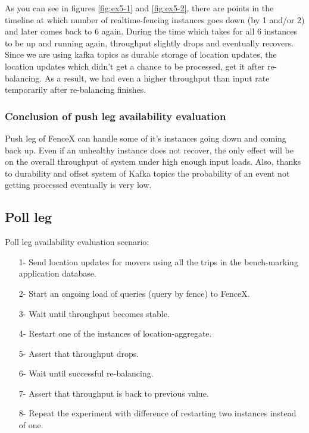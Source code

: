 \documentclass[a4]{report}
\begin{document}
    As you can see in figures \ref{fig:ex5-1} and \ref{fig:ex5-2}, there are points in the timeline at which number of
    realtime-fencing instances goes down (by 1 and/or 2) and later comes back to 6 again.
    During the time which takes for all 6 instances to be up and running again, throughput slightly drops and
    eventually recovers.
    Since we are using kafka topics as durable storage of location updates, the location updates which
    didn't get a chance to be processed, get it after re-balancing.
    As a result, we had even a higher throughput than input rate temporarily after re-balancing finishes.

    \subsubsection{Conclusion of push leg availability evaluation}
    Push leg of FenceX can handle some of it's instances going down and coming back up.
    Even if an unhealthy instance does not recover, the only effect will be on the overall throughput of system under
    high enough input loads.
    Also, thanks to durability and offset system of Kafka topics the probability of an event not getting processed
    eventually is very low.

    \subsection{Poll leg}
    Poll leg availability evaluation scenario:
    \begin{itemize}
        \item[1-] Send location updates for movers using all the trips in the bench-marking application database.
        \item[2-] Start an ongoing load of queries (query by fence) to FenceX.
        \item[3-] Wait until throughput becomes stable.
        \item[4-] Restart one of the instances of location-aggregate.
        \item[5-] Assert that throughput drops.
        \item[6-] Wait until successful re-balancing.
        \item[7-] Assert that throughput is back to previous value.
        \item[8-] Repeat the experiment with difference of restarting two instances instead of one.
    \end{itemize}
\end{document}
